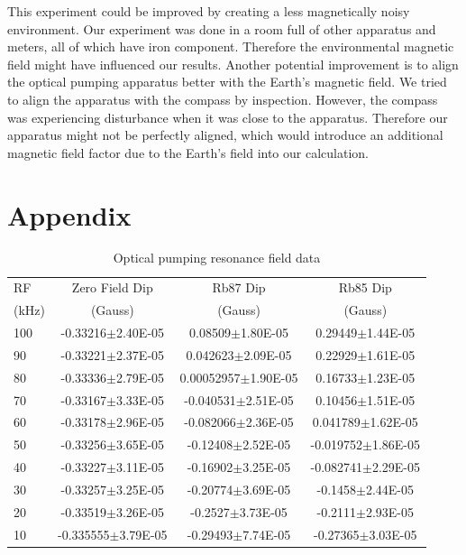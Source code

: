 \documentclass[prb,preprint]{revtex4-1}
\begin{document}
This experiment could be improved by creating a less magnetically noisy environment. Our experiment was done in a room full of other apparatus and meters, all of which have iron component. Therefore the environmental magnetic field might have influenced our results. Another potential improvement is to align the optical pumping apparatus better with the Earth's magnetic field. We tried to align the apparatus with the compass by inspection. However, the compass was experiencing disturbance when it was close to the apparatus. Therefore our apparatus might not be perfectly aligned, which would introduce an additional magnetic field factor due to the Earth's field into our calculation. \\




\section{Appendix}
\begin{table}[h]
\centering
\caption{Optical pumping resonance field data}
\begin{ruledtabular}
\begin{tabular}{ l c c c}
RF & Zero Field Dip & Rb87 Dip & Rb85 Dip\\
(kHz) & (Gauss) & (Gauss) & (Gauss)\\
\hline
100	& -0.33216$\pm$2.40E-05 & 0.08509$\pm$1.80E-05 & 0.29449$\pm$1.44E-05\\
90&-0.33221$\pm$2.37E-05&0.042623$\pm$2.09E-05&0.22929$\pm$1.61E-05\\
80&-0.33336$\pm$2.79E-05&0.00052957$\pm$1.90E-05&0.16733$\pm$1.23E-05\\
70&-0.33167$\pm$3.33E-05&-0.040531$\pm$2.51E-05&0.10456$\pm$1.51E-05\\
60&-0.33178$\pm$2.96E-05&-0.082066$\pm$2.36E-05&0.041789$\pm$1.62E-05\\
50&-0.33256$\pm$3.65E-05&-0.12408$\pm$2.52E-05&-0.019752$\pm$1.86E-05\\
40&-0.33227$\pm$3.11E-05&-0.16902$\pm$3.25E-05&-0.082741$\pm$2.29E-05\\
30&-0.33257$\pm$3.25E-05&-0.20774$\pm$3.69E-05&-0.1458$\pm$2.44E-05	\\
20&-0.33519$\pm$3.26E-05&-0.2527$\pm$3.73E-05&-0.2111$\pm$2.93E-05\\
10	&-0.335555$\pm$3.79E-05&-0.29493$\pm$7.74E-05&-0.27365$\pm$3.03E-05\\
\end{tabular}
\end{ruledtabular}
\label{data}
\end{table}
\end{document}
